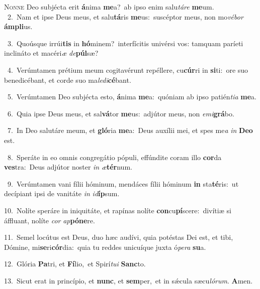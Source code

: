 \lettrine{\initial\textcolor{\initialcolor}{N}}{onne} Deo subjécta erit \textbf{á}\-nima \textbf{me}\-a?~\star ab ipso enim salu\-\textit{tá}\-\textit{re} \textbf{me}\-um.\\
{\numbfont\textcolor{\numbcolor}{~2.}}~Nam et ipse Deus meus, et salu\-\textbf{tá}\-ris \textbf{me}\-us:~\star suscéptor meus, non mo\-\textit{vé}\-\textit{bor} \textbf{ám}\-\textbf{pli}us.\par
{\numbfont\textcolor{\numbcolor}{~3.}}~Quoúsque irrúi\textbf{tis} in \textbf{hó}\-minem?~\star interfícitis univérsi vos: tamquam paríeti inclináto et macéri\textit{æ} \textit{de}\-\textbf{púl}sæ?\par
{\numbfont\textcolor{\numbcolor}{~4.}}~Verúmtamen prétium meum cogitavérunt repéllere, cu\-\textbf{cúr}\-ri in \textbf{si}\-ti:~\star ore suo benedicébant, et corde suo ma\-\textit{le}\-\textit{di}\textbf{cé}bant.\par
{\numbfont\textcolor{\numbcolor}{~5.}}~Verúmtamen Deo subjécta esto, \textbf{á}\-nima \textbf{me}\-a:~\star quóniam ab ipso patién\-\textit{ti}\-\textit{a} \textbf{me}\-a.\par
{\numbfont\textcolor{\numbcolor}{~6.}}~Quia ipse Deus meus, et sal\-\textbf{vá}\-tor \textbf{me}\-us:~\star adjútor meus, non \textit{e}\-\textit{mi}\textbf{grá}bo.\par
{\numbfont\textcolor{\numbcolor}{~7.}}~In Deo salutáre meum, et \textbf{gló}\-ria \textbf{me}\-a:~\star Deus auxílii mei, et spes me\textit{a} \textit{in} \textbf{De}\-\textbf{o} est.\par
{\numbfont\textcolor{\numbcolor}{~8.}}~Speráte in eo omnis congregátio pópuli, effúndite coram illo \textbf{cor}\-da \textbf{ves}\-tra:~\star Deus adjútor noster \textit{in} \textit{æ}\-\textbf{tér}num.\par
{\numbfont\textcolor{\numbcolor}{~9.}}~Verúmtamen vani fílii hóminum, mendáces fílii hóminum \textbf{in} sta\-\textbf{té}\-ris:~\star ut decípiant ipsi de vanitáte \textit{in} \textit{id}\-\textbf{íp}sum.\par
{\numbfont\textcolor{\numbcolor}{10.}}~Nolíte speráre in iniquitáte, et rapínas nolíte \textbf{con}\-cu\-\textbf{pí}\-scere:~\star divítiæ si áffluant, nolíte \textit{cor} \textit{ap}\-\textbf{pó}\textbf{ne}re.\par
{\numbfont\textcolor{\numbcolor}{11.}}~Semel locútus est Deus, duo hæc audívi, quia potéstas Dei est, et tibi, Dómine, mi\-\textbf{se}\-ri\-\textbf{cór}\-dia:~\star quia tu reddes unicuíque juxta ó\-\textit{pe}\-\textit{ra} \textbf{su}\-a.\par
{\numbfont\textcolor{\numbcolor}{12.}}~Glória \textbf{Pa}\-tri, et \textbf{Fí}\-lio,~\star et Spirí\-\textit{tu}\-\textit{i} \textbf{Sanc}\-to.\par
{\numbfont\textcolor{\numbcolor}{13.}}~Sicut erat in princípio, et \textbf{nunc}\-, et \textbf{sem}\-per,~\star et in sǽcula sæcu\-\textit{ló}\-\textit{rum}. \textbf{A}\-men.\par
